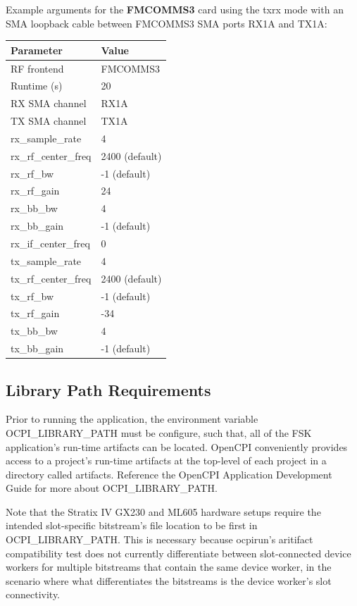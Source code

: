 \noindent Example arguments for the \textbf{FMCOMMS3} card using the txrx mode with an SMA loopback cable between FMCOMMS3 SMA ports RX1A and TX1A:\\
\begin{tabular}{|l|l|}
\hline
\rowcolor{blue}
Parameter 	&        Value  	\\
\hline
RF frontend 	&        FMCOMMS3             	\\
\hline
Runtime (s) 	&        20 	        \\
\hline
RX SMA channel 	&        RX1A              	\\
\hline
TX SMA channel 	&        TX1A           	\\
\hline
rx\_sample\_rate 	&4 	                \\
\hline
rx\_rf\_center\_freq 	&2400 (default)  	\\
\hline
rx\_rf\_bw 	&        -1 (default)   \\
\hline
rx\_rf\_gain 	&        24       	\\
\hline
rx\_bb\_bw 	&        4 	        \\
\hline
rx\_bb\_gain 	&        -1 (default) 	\\
\hline
rx\_if\_center\_freq 	&0              	\\
\hline
tx\_sample\_rate 	&4              	\\
\hline
tx\_rf\_center\_freq 	&2400 (default)\\
\hline
tx\_rf\_bw 	&        -1 (default)   \\
\hline
tx\_rf\_gain 	&        -34 	        \\
\hline
tx\_bb\_bw 	&        4        	\\
\hline
tx\_bb\_gain    &       -1 (default) \\
\hline
\end{tabular}\par\medskip

\pagebreak
\subsection{Library Path Requirements}
\noindent Prior to running the application, the environment variable OCPI\_LIBRARY\_PATH must be configure, such that, all of the FSK application's run-time artifacts can be located. OpenCPI conveniently provides access to a project's run-time artifacts at the top-level of each project in a directory called artifacts. Reference the OpenCPI Application Development Guide for more about OCPI\_LIBRARY\_PATH. \par\medskip
\noindent Note that the Stratix IV GX230 and ML605 hardware setups require the intended slot-specific bitstream's file location to be first in OCPI\_LIBRARY\_PATH. This is necessary because ocpirun's aritifact compatibility test does not currently differentiate between slot-connected device workers for multiple bitstreams that contain the same device worker, in the scenario where what differentiates the bitstreams is the device worker's slot connectivity. \par\medskip

